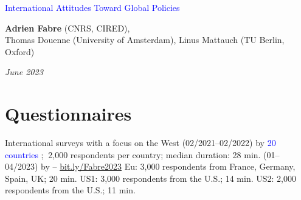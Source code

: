 \documentclass[aspectratio=169,xcolor=dvipsnames, 11pt,mathserif]{beamer}
\begin{document}
\begin{frame}
\thispagestyle{empty}
\begin{center}
\begin{LARGE}
\textcolor{blue}{International Attitudes Toward Global Policies}
\end{LARGE}

\vspace{1cm}
\textbf{Adrien Fabre} (CNRS, CIRED),\\ Thomas Douenne (University of Amsterdam), Linus Mattauch (TU Berlin, Oxford)

\medskip
{}
\textit{June 2023} 

\end{center}

\bigskip

\end{frame}


\section{Questionnaires}

\begin{frame}{International surveys with a focus on the West\label{questionnaires}}
    \bbvs
    \ip {}  (02/2021--02/2022) by  
    \bbvs \ip \textcolor{blue}{20 countries}%
    ; $~$2,000 respondents per country; median duration: 28 min. \ee
    \ip {} (01--04/2023) by  -- \href{https://bit.ly/Fabre2023}{bit.ly/Fabre2023}
    \bbvs \ip Eu: 3,000 respondents from France, Germany, Spain, UK; 20 min. 
    \ip US1: 3,000 respondents from the U.S.; 14 min. 
    \ip US2: 2,000 respondents from the U.S.; 11 min.
    \ee 
    \ee \vspace*{-.2cm}
\end{frame}
\end{document}
